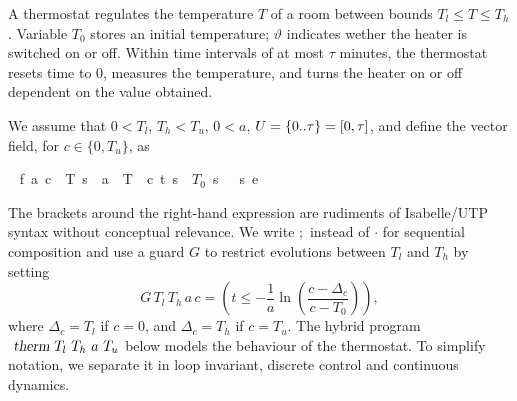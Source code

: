 \documentclass[envcountsame,envcountsect]{llncs}
\begin{document}
\begin{example}\label{ex:therm-sol}
  A thermostat regulates the temperature $T$ of a room between bounds
  $T_l\le T\le T_h$. Variable $T_0$ stores an initial temperature;
  $\vartheta$ indicates wether the heater is switched on or off.
  Within time intervals of at most $\tau$ minutes, the thermostat
  resets time to $0$, measures the temperature, and turns the heater
  on or off dependent on the value obtained.

We assume that $0<T_l$, $T_h<T_u$, $0 < a$,
$U={\emph{$\{$}}{0}{\emph{$\mathord.$}}{\emph{$\mathord.$}}{\emph{$\tau$}}{\emph{$\}$}}=[0,\tau]$, and define the vector field, for $c\in\{0,T_u\}$, as

\begin{isabellebody}
\isanewline
{}\ %
{\isachardoublequoteopen}f\ a\ c\ {\isasymequiv}\ {\isasymlbrakk}{\isacharbrackleft}T\ {\isasymmapsto}\isactrlsub s\ {\isacharminus}\ a\ {\isacharasterisk}\ {\isacharparenleft}T\ {\isacharminus}\ c{\isacharparenright}{\isacharcomma}\ t\ {\isasymmapsto}\isactrlsub s\ {}{\isacharcomma}\ $T_0$\ {\isasymmapsto}\isactrlsub s\ {}{\isacharcomma}\ {\isasymtheta}\ {\isasymmapsto}\isactrlsub s\ {}{\isacharbrackright}{\isasymrbrakk}\isactrlsub e{\isachardoublequoteclose}\isanewline
\end{isabellebody} 
\noindent The brackets around the right-hand expression are rudiments of
Isabelle/UTP syntax without conceptual relevance. We write $;$ instead
of $\cdot$ for sequential composition and use a guard $G$ to restrict
evolutions between $T_l$ and $T_h$ by setting
\begin{equation*}
G\, T_l\, T_h\, a\, c = \left(t\leq -\frac{1}{a}\ln\left(\frac{c-\Delta_c}{c-T_0}\right)\right),
\end{equation*}
where $\Delta_c = T_l$ if $c=0$, and $\Delta_c = T_h$ if $c=T_u$. The
hybrid program $\isa{therm}\ T_l\ T_h\ a\ T_u$ below models the
behaviour of the thermostat. To simplify notation, we separate it in
loop invariant, discrete control and continuous dynamics.


\end{example}
\end{document}

